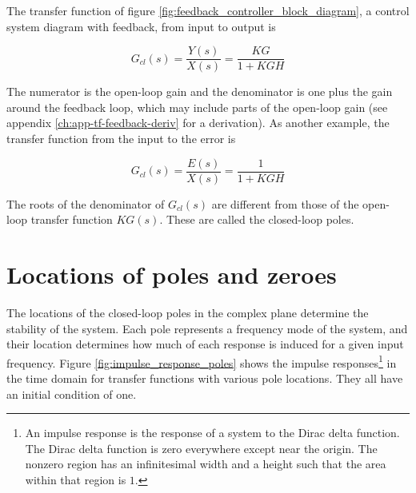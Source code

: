 The transfer function of figure \ref{fig:feedback_controller_block_diagram}, a
control system diagram with feedback, from input to output is

\begin{equation}
  G_{cl}(s) = \frac{Y(s)}{X(s)} = \frac{KG}{1 + KGH}
\end{equation}

The numerator is the \gls{open-loop gain} and the denominator is one plus the
gain around the feedback loop, which may include parts of the
\gls{open-loop gain} (see appendix \ref{ch:app-tf-feedback-deriv} for a
derivation). As another example, the transfer function from the input to the
error is

\begin{equation}
  G_{cl}(s) = \frac{E(s)}{X(s)} = \frac{1}{1 + KGH}
\end{equation}

The roots of the denominator of $G_{cl}(s)$ are different from those of the
open-loop transfer function $KG(s)$. These are called the closed-loop poles.

\section{Locations of poles and zeroes}

The locations of the closed-loop poles in the complex plane determine the
stability of the \gls{system}. Each pole represents a frequency mode of the
\gls{system}, and their location determines how much of each response is induced
for a given input frequency. Figure \ref{fig:impulse_response_poles} shows the
impulse responses\footnote{An impulse response is the response of a \gls{system}
to the Dirac delta function. The Dirac delta function is zero everywhere except
near the origin. The nonzero region has an infinitesimal width and a height such
that the area within that region is $1$.} in the time domain for transfer
functions with various pole locations. They all have an initial condition of
one.

